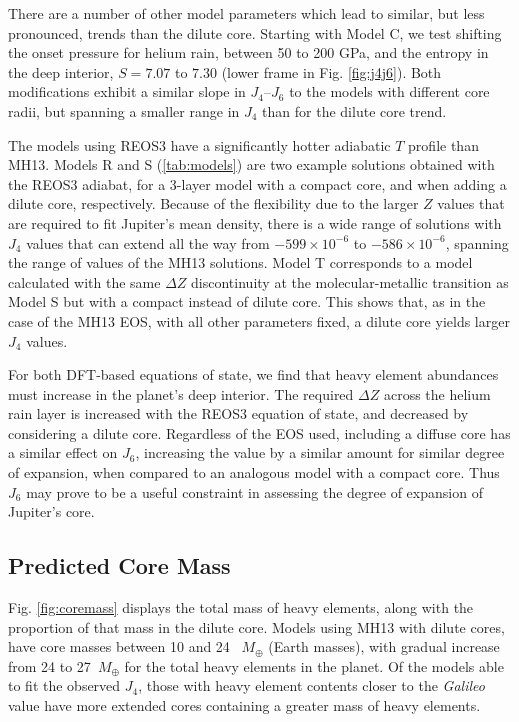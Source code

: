 There are a number of other model parameters which lead to similar, but less
pronounced, trends than the dilute core. Starting with Model C, we test
shifting the onset pressure for helium rain, between 50 to 200 GPa, and the
entropy in the deep interior, $S=7.07$ to $7.30$ (lower frame in Fig.
\ref{fig:j4j6}).  Both modifications exhibit a similar slope in $J_4$--$J_6$ to
the models with different core radii, but spanning a smaller range in $J_4$
than for the dilute core trend. 

The models using REOS3 have a significantly hotter adiabatic $T$ profile than
MH13.  Models R and S (\ref{tab:models}) are two example solutions obtained
with the REOS3 adiabat, for a 3-layer model with a compact core, and when
adding a dilute core, respectively.  Because of the flexibility due to the
larger $Z$ values that are required to fit Jupiter's mean density, there is a
wide range of solutions \citep{Nettelmann2012, miguel2016} with $J_4$ values
that can extend all the way from $-599\times 10^{-6}$ to $-586\times 10^{-6}$, spanning the
range of values of the MH13 solutions. Model T corresponds to a model calculated 
with the same $\Delta Z$ discontinuity at the molecular-metallic transition as Model S 
but with a compact instead of dilute core. This shows that, as in the case of the MH13 EOS, 
with all other parameters fixed, a dilute core yields larger $J_4$ values.  

For both DFT-based equations of state, we find that heavy element abundances
must increase in the planet's deep interior. The required $\Delta Z$ across the
helium rain layer is increased with the REOS3 equation of state, and
decreased by considering a dilute core.  Regardless of the EOS used, including
a diffuse core has a similar effect on $J_6$, increasing the value by a
similar amount for similar degree of expansion, when compared to an analogous
model with a compact core. Thus $J_6$ may prove to be a useful constraint in
assessing the degree of expansion of Jupiter's core. 

\subsection{Predicted Core Mass} \label{sec:core_mass}

Fig. \ref{fig:coremass} displays the total mass of heavy elements, along with
the proportion of that mass in the dilute core. Models using MH13 with dilute
cores, have core masses between 10 and 24 ~$M_\oplus$ (Earth masses), with
gradual increase from 24 to 27~$M_\oplus$ for the total heavy elements in the
planet. Of the models able to fit the observed $J_4$, those with heavy element
contents closer to the \textit{Galileo} value have more extended cores
containing a greater mass of heavy elements. 

